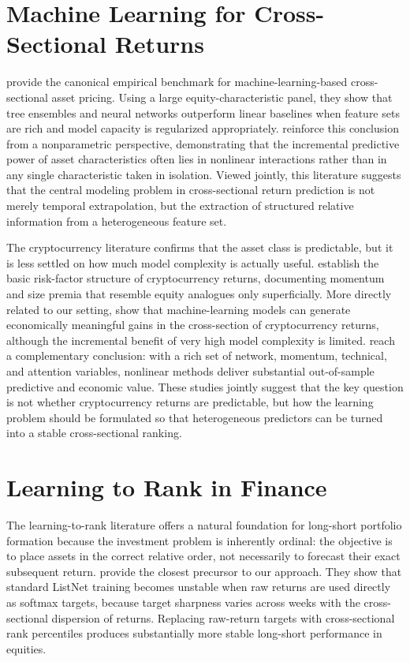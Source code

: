 \section{Machine Learning for Cross-Sectional Returns}

\citet{gu2020empirical} provide the canonical empirical benchmark for
machine-learning-based cross-sectional asset pricing.
Using a large equity-characteristic panel, they show that tree ensembles
and neural networks outperform linear baselines when feature sets are rich
and model capacity is regularized appropriately.
\citet{freyberger2020dissecting} reinforce this conclusion from a
nonparametric perspective, demonstrating that the incremental predictive
power of asset characteristics often lies in nonlinear interactions rather
than in any single characteristic taken in isolation.
Viewed jointly, this literature suggests that the central modeling problem
in cross-sectional return prediction is not merely temporal extrapolation,
but the extraction of structured relative information from a heterogeneous
feature set.

The cryptocurrency literature confirms that the asset class is predictable,
but it is less settled on how much model complexity is actually useful.
\citet{liu2022cryptocurrency} establish the basic risk-factor structure of
cryptocurrency returns, documenting momentum and size premia that resemble
equity analogues only superficially.
More directly related to our setting, \citet{cakici2024crypto_ml} show that
machine-learning models can generate economically meaningful gains in the
cross-section of cryptocurrency returns, although the incremental benefit of
very high model complexity is limited.
\citet{filippou2024crypto_ml} reach a complementary conclusion: with a rich
set of network, momentum, technical, and attention variables, nonlinear
methods deliver substantial out-of-sample predictive and economic value.
These studies jointly suggest that the key question is not whether
cryptocurrency returns are predictable, but how the learning problem should
be formulated so that heterogeneous predictors can be turned into a stable
cross-sectional ranking.

\section{Learning to Rank in Finance}

The learning-to-rank literature \citep{cao2007learning} offers a natural
foundation for long-short portfolio formation because the investment problem
is inherently ordinal: the objective is to place assets in the correct
relative order, not necessarily to forecast their exact subsequent return.
\citet{poh2021building} provide the closest precursor to our approach.
They show that standard ListNet training becomes unstable when raw returns
are used directly as softmax targets, because target sharpness varies across
weeks with the cross-sectional dispersion of returns.
Replacing raw-return targets with cross-sectional rank percentiles produces
substantially more stable long-short performance in equities.

